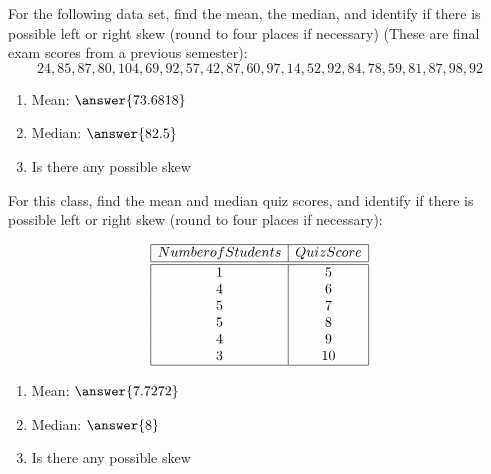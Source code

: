 \documentclass{ximera}
\begin{document}
\begin{problem}
For the following data set, find the mean, the median, and identify if there is possible left or right skew (round to four places if necessary) (These are final exam scores from a previous semester):
$$24, 85, 87,80, 104, 69, 92, 57, 42, 87, 60, 97, 14, 52, 92, 84, 78, 59, 81, 87, 98, 92$$

\begin{enumerate}
\item Mean: $\answer{73.6818}$
\item Median: $\answer{82.5}$
\item Is there any possible skew
\begin{multipleChoice}
\end{multipleChoice}

\end{enumerate}


\end{problem}


 
 \begin{problem}
For this class, find the mean and median quiz scores, and identify if there is possible left or right skew (round to four places if necessary):

$$\begin{array}{|c|c|}
\hline
Number of Students & Quiz Score\\
\hline
\hline
1 & 5\\
4 & 6\\
5 & 7\\
5 & 8\\
4 & 9\\
3 & 10\\
\hline
\end{array}$$


\begin{enumerate}
\item Mean: $\answer{7.7272}$
\item Median: $\answer{8}$
\item Is there any possible skew
\begin{multipleChoice}
\end{multipleChoice}

\end{enumerate}


\end{problem}

 
 
      
\end{document}
